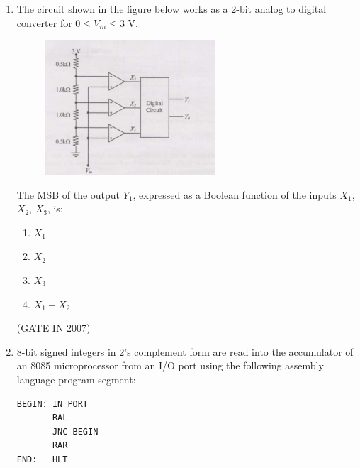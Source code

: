 \documentclass[journal]{IEEEtran}
\begin{document}
\begin{enumerate}
The assembly language instruction being executed is:

\begin{multicols}{4}
\begin{enumerate}
    \item IN 24H
    \item IN 20H
    \item OUT 24H
    \item OUT 20H
\end{enumerate}
\end{multicols}
\hfill(GATE IN 2007)
\item The circuit shown in the figure below works as a 2-bit analog to digital converter for $0 \leq V_{in} \leq 3$ V.
\begin{figure}[H]
    \centering
      \includegraphics[width=0.6\textwidth]{40.jpg} 
      \caption{}
    \label{fig:fig40} 
\end{figure}
The MSB of the output $Y_1$, expressed as a Boolean function of the inputs $X_1$, $X_2$, $X_3$, is:

\begin{multicols}{4}
\begin{enumerate}
    \item $X_1$
    \item $X_2$
    \item $X_3$
    \item $X_1 + X_2$
\end{enumerate}
\end{multicols}
\hfill(GATE IN 2007)
\item 8-bit signed integers in 2's complement form are read into the accumulator of an 8085 microprocessor from an I/O port using the following assembly language program segment:
 \begin{verbatim}
BEGIN: IN PORT
       RAL
       JNC BEGIN
       RAR
END:   HLT
\end{verbatim}




\end{enumerate}
\end{document}

